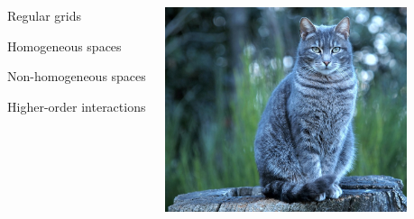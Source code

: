 \documentclass[landscape,a0paper,blockverticalspace = 5mm]{tikzposter}
\begin{document}
\begin{columns}
{{\begin{center}
       \end{center}



\begin{center}
\begin{minipage}{0.16\linewidth}
		\begin{center}
		Regular grids
	\end{center}
      \end{minipage}
      \begin{minipage}{0.1\linewidth}
         \begin{center}
	\end{center}
      \end{minipage}
	\begin{minipage}{0.16\linewidth}
         \begin{center}
		Homogeneous spaces
	\end{center}
      \end{minipage}
      \begin{minipage}{0.1\linewidth}
         \begin{center}
	\end{center}
      \end{minipage}
	\begin{minipage}{0.16\linewidth}
         \begin{center}
		Non-homogeneous spaces
	\end{center}
      \end{minipage}
     \begin{minipage}{0.1\linewidth}
         \begin{center}
	\end{center}
      \end{minipage}
	\begin{minipage}{0.16\linewidth}
         \begin{center}
		Higher-order interactions
	\end{center}
      \end{minipage}

       \end{center}


\begin{center}
		 \begin{minipage}{0.16\linewidth}
		 \begin{center}

          \includegraphics[height=6cm]{figures/cat.jpg}
          \vspace{0.5cm}


\end{center}
\end{minipage}
\end{center}}}
\end{columns}
\end{document}
